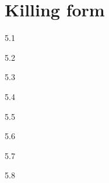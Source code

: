 \chapter{Killing form}

\begin{solution}{}{5.1}
    
\end{solution}

\begin{solution}{}{5.2}

\end{solution}

\begin{solution}{}{5.3}
    
\end{solution}

\begin{solution}{}{5.4}

\end{solution}

\begin{solution}{}{5.5}
    
\end{solution}

\begin{solution}{}{5.6}

\end{solution}

\begin{solution}{}{5.7}
    
\end{solution}

\begin{solution}{}{5.8}

\end{solution}